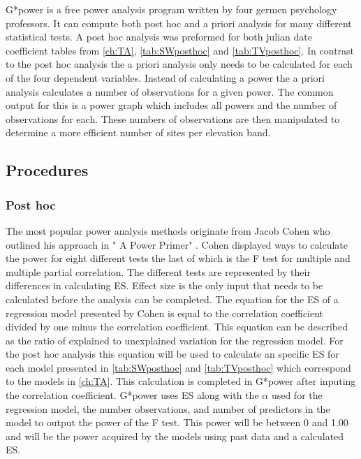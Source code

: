 G*power is a free power analysis program written by four germen psychology professors.
It can compute both post hoc and a priori analysis for many different statistical tests.
A post hoc analysis was preformed for both julian date coefficient tables from \autoref{ch:TA},  \autoref{tab:SWposthoc} and \autoref{tab:TVposthoc}.
In contrast to the post hoc analysis the a priori analysis only needs to be calculated for each of the four dependent variables.
Instead of calculating a power the a priori analysis calculates a number of observations for a given power.
The common output for this is a power graph which includes all powers and the number of observations for each.
These numbers of observations are then manipulated to determine a more efficient number of sites per elevation band.

\subsection{Procedures}

\subsubsection{Post hoc}

The most popular power analysis methods originate from Jacob Cohen who outlined his approach in " A Power Primer" \citep{cohen1992power}.
Cohen displayed ways to calculate the power for eight different tests the last of which is the F test for multiple and multiple partial correlation.
The different tests are represented by their differences in calculating ES.
Effect size is the only input that needs to be calculated before the analysis can be completed.
The equation for the ES of a regression model presented by Cohen is equal to the correlation coefficient divided by one minus the correlation coefficient.
This equation can be described as the ratio of explained to unexplained variation for the regression model.
For the post hoc analysis this equation will be used to calculate an specific ES for each model presented in \autoref{tab:SWposthoc} and \autoref{tab:TVposthoc} which correspond to the models in \autoref{ch:TA}.
This calculation is completed in G*power after inputing the correlation coefficient.
G*power uses ES along with the $\alpha$ used for the regression model, the number observations, and number of predictors in the model to output the power of the F test.
This power will be between 0 and 1.00 and will be the power acquired by the models using past data and a calculated ES.


